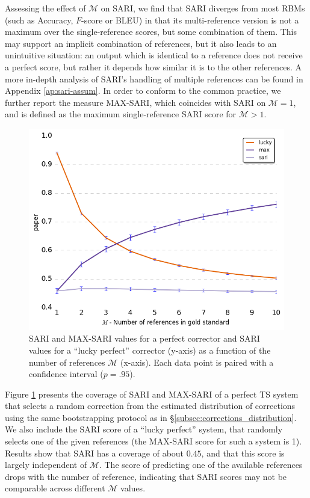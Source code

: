\documentclass[letterpaper, 11pt]{article}
\begin{document}
Assessing the effect of $\mathcal{M}$ on SARI, we find that SARI diverges from most RBMs (such as Accuracy, $F$-score or BLEU) 
in that its multi-reference version is not a maximum over the single-reference scores, but some combination of them.
This may support an implicit combination of references, but it also leads to an unintuitive situation: an output
which is identical to a reference does not receive a perfect score, but rather it depends how similar it is to the other
references. A more in-depth analysis of SARI's handling of multiple references can be found in Appendix \ref{ap:sari-assum}.
In order to conform to the common practice, we further report the measure MAX-SARI, which coincides with SARI on $\mathcal{M}=1$, 
and is defined as the maximum single-reference SARI score for $\mathcal{M}>1$.

\begin{figure}
	\includegraphics[width=0.9\columnwidth]{lucky,max,paper_Ms_significance}
	\caption{
		SARI and MAX-SARI values for a perfect corrector and SARI values for a ``lucky perfect'' corrector (y-axis) as a function of the number of references $\mathcal{M}$ (x-axis).
		Each data point is paired with a confidence interval ($p=.95$).\label{fig:SARI_Ms}}
	\vspace{-0.5cm}
\end{figure}

Figure \ref{fig:SARI_Ms} presents the coverage of SARI and MAX-SARI of a perfect TS system that selects a random correction
from the estimated distribution of corrections using the same bootstrapping protocol as in \S\ref{subsec:corrections_distribution}.
We also include the SARI score of a ``lucky perfect'' system, that randomly selects one of 
the given references (the MAX-SARI score for such a system is 1). 
Results show that SARI has a coverage of about $0.45$, and that this score is largely independent of $\mathcal{M}$.
The score of predicting one of the available references drops with the number of reference, indicating that SARI scores may not be comparable
across different $\mathcal{M}$ values. 
\end{document}
